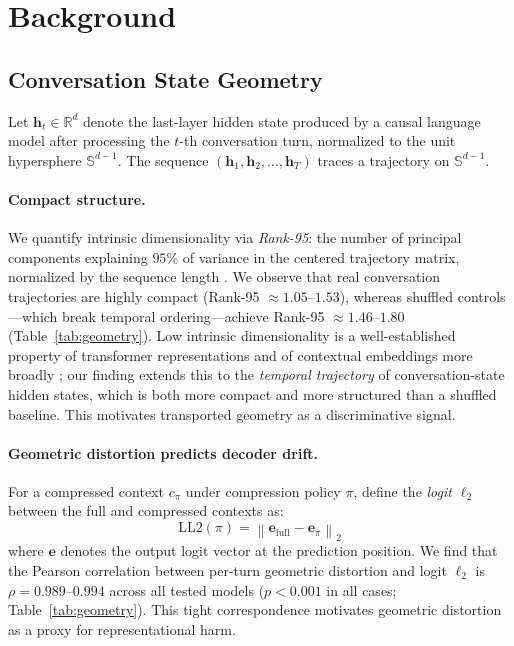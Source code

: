 \documentclass[11pt]{article}
\newcommand{\hv}{\mathbf{h}}
\newcommand{\Sph}{\mathbb{S}}
\newcommand{\R}{\mathbb{R}}
\begin{document}
\section{Background}
\label{sec:background}

\subsection{Conversation State Geometry}
\label{sec:geo}

Let $\hv_t \in \R^d$ denote the last-layer hidden state produced by a
causal language model after processing the $t$-th conversation turn,
normalized to the unit hypersphere $\Sph^{d-1}$.
The sequence $(\hv_1, \hv_2, \ldots, \hv_T)$ traces a trajectory on $\Sph^{d-1}$.

\paragraph{Compact structure.}
We quantify intrinsic dimensionality via \emph{Rank-95}:
the number of principal components explaining $95\%$ of variance
in the centered trajectory matrix, normalized by the sequence length
\citep{roy-vetterli-2007-effective}.
We observe that real conversation trajectories are highly compact
(Rank-95 $\approx 1.05$--$1.53$), whereas shuffled controls---which
break temporal ordering---achieve Rank-95 $\approx 1.46$--$1.80$
(Table~\ref{tab:geometry}).
Low intrinsic dimensionality is a well-established property of transformer
representations \citep{li-etal-2018-measuring, aghajanyan-etal-2021-intrinsic}
and of contextual embeddings more broadly \citep{ethayarajh-2019-contextual,
cai-etal-2021-isotropy}; our finding extends this to the \emph{temporal
trajectory} of conversation-state hidden states, which is both more compact
and more structured than a shuffled baseline.
This motivates transported geometry as a discriminative signal.

\paragraph{Geometric distortion predicts decoder drift.}
For a compressed context $c_\pi$ under compression policy $\pi$,
define the \emph{logit $\ell_2$} between the full and compressed contexts as:
\[
\mathrm{LL2}(\pi) = \left\| \mathbf{e}_{\text{full}} - \mathbf{e}_\pi \right\|_2
\]
where $\mathbf{e}$ denotes the output logit vector at the prediction position.
We find that the Pearson correlation between per-turn geometric distortion
and logit $\ell_2$ is $\rho = 0.989$--$0.994$ across all tested models
($p < 0.001$ in all cases; Table~\ref{tab:geometry}).
This tight correspondence motivates geometric distortion as a proxy for
representational harm.
\end{document}
